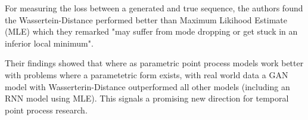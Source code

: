 For measuring the loss between a generated and true sequence, the authors found the Wassertein-Distance \parencite{WassGAN} performed better than Maximum Likihood Estimate (MLE) which they remarked "may suffer from mode dropping or get stuck in an inferior local minimum".

Their findings showed that where as parametric point process models work better with problems where a parametetric form exists, with real world data a GAN model with Wasserterin-Distance outperformed all other models (including an RNN model using MLE). This signals a promising new direction for temporal point process research.